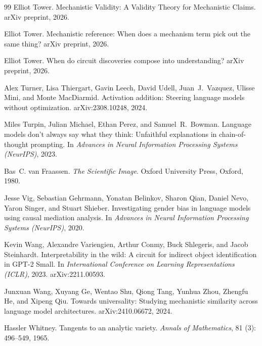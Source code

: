 \documentclass{article}
\begin{document}
\begin{thebibliography}{99}
Elliot Tower.
\newblock Mechanistic Validity: A Validity Theory for Mechanistic Claims.
\newblock arXiv preprint, 2026.

Elliot Tower.
\newblock Mechanistic reference: When does a mechanism term pick out the same
  thing?
\newblock arXiv preprint, 2026.

Elliot Tower.
\newblock When do circuit discoveries compose into understanding?
\newblock arXiv preprint, 2026.

Alex Turner, Lisa Thiergart, Gavin Leech, David Udell, Juan~J.\ Vazquez,
  Ulisse Mini, and Monte MacDiarmid.
\newblock Activation addition: Steering language models without optimization.
\newblock arXiv:2308.10248, 2024.

Miles Turpin, Julian Michael, Ethan Perez, and Samuel~R.\ Bowman.
\newblock Language models don't always say what they think: Unfaithful
  explanations in chain-of-thought prompting.
\newblock In \emph{Advances in Neural Information Processing Systems (NeurIPS)}, 2023.

Bas~C. van Fraassen.
\newblock \emph{The Scientific Image}.
\newblock Oxford University Press, Oxford, 1980.

Jesse Vig, Sebastian Gehrmann, Yonatan Belinkov, Sharon Qian, Daniel Nevo,
  Yaron Singer, and Stuart Shieber.
\newblock Investigating gender bias in language models using causal mediation
  analysis.
\newblock In \emph{Advances in Neural Information Processing Systems (NeurIPS)}, 2020.

Kevin Wang, Alexandre Variengien, Arthur Conmy, Buck Shlegeris, and Jacob
  Steinhardt.
\newblock Interpretability in the wild: A circuit for indirect object
  identification in {GPT-2 Small}.
\newblock In \emph{International Conference on Learning Representations
  (ICLR)}, 2023.
\newblock arXiv:2211.00593.

Junxuan Wang, Xuyang Ge, Wentao Shu, Qiong Tang, Yunhua Zhou, Zhengfu He, and
  Xipeng Qiu.
\newblock Towards universality: Studying mechanistic similarity across language
  model architectures.
\newblock arXiv:2410.06672, 2024.

Hassler Whitney.
\newblock Tangents to an analytic variety.
\newblock \emph{Annals of Mathematics}, 81 (3): 496--549, 1965.


\end{thebibliography}
\end{document}
